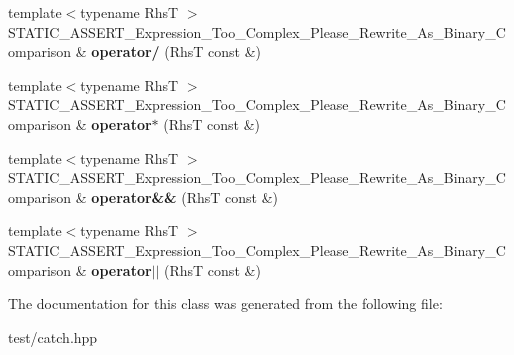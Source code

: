\begin{DoxyCompactItemize}
\item 
{\footnotesize template$<$typename RhsT $>$ }\\S\+T\+A\+T\+I\+C\+\_\+\+A\+S\+S\+E\+R\+T\+\_\+\+Expression\+\_\+\+Too\+\_\+\+Complex\+\_\+\+Please\+\_\+\+Rewrite\+\_\+\+As\+\_\+\+Binary\+\_\+\+Comparison \& {\bfseries operator/} (RhsT const \&)\hypertarget{classCatch_1_1ExpressionLhs_a37d50565046ac9b1c9159a7c0cf88a1e}{}\label{classCatch_1_1ExpressionLhs_a37d50565046ac9b1c9159a7c0cf88a1e}

\item 
{\footnotesize template$<$typename RhsT $>$ }\\S\+T\+A\+T\+I\+C\+\_\+\+A\+S\+S\+E\+R\+T\+\_\+\+Expression\+\_\+\+Too\+\_\+\+Complex\+\_\+\+Please\+\_\+\+Rewrite\+\_\+\+As\+\_\+\+Binary\+\_\+\+Comparison \& {\bfseries operator$\ast$} (RhsT const \&)\hypertarget{classCatch_1_1ExpressionLhs_a9a94294c22449f62087862ef911e6291}{}\label{classCatch_1_1ExpressionLhs_a9a94294c22449f62087862ef911e6291}

\item 
{\footnotesize template$<$typename RhsT $>$ }\\S\+T\+A\+T\+I\+C\+\_\+\+A\+S\+S\+E\+R\+T\+\_\+\+Expression\+\_\+\+Too\+\_\+\+Complex\+\_\+\+Please\+\_\+\+Rewrite\+\_\+\+As\+\_\+\+Binary\+\_\+\+Comparison \& {\bfseries operator\&\&} (RhsT const \&)\hypertarget{classCatch_1_1ExpressionLhs_a7f022056ef4f25e716ab85846be6229f}{}\label{classCatch_1_1ExpressionLhs_a7f022056ef4f25e716ab85846be6229f}

\item 
{\footnotesize template$<$typename RhsT $>$ }\\S\+T\+A\+T\+I\+C\+\_\+\+A\+S\+S\+E\+R\+T\+\_\+\+Expression\+\_\+\+Too\+\_\+\+Complex\+\_\+\+Please\+\_\+\+Rewrite\+\_\+\+As\+\_\+\+Binary\+\_\+\+Comparison \& {\bfseries operator$\vert$$\vert$} (RhsT const \&)\hypertarget{classCatch_1_1ExpressionLhs_a6932b72da79d6c6b03d867772ceac61b}{}\label{classCatch_1_1ExpressionLhs_a6932b72da79d6c6b03d867772ceac61b}

\end{DoxyCompactItemize}


The documentation for this class was generated from the following file\+:\begin{DoxyCompactItemize}
\item 
test/catch.\+hpp\end{DoxyCompactItemize}
